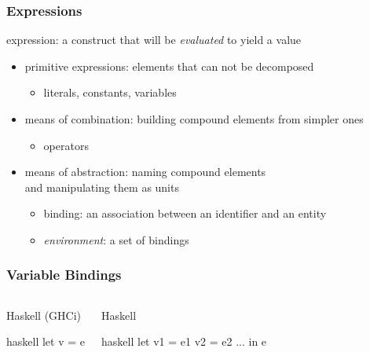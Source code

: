 \documentclass[dvipsnames]{beamer}
\theoremstyle{plain}
\begin{document}
\begin{frame}
  \frametitle{Expressions}

  \begin{definition}
    \alert{expression}: a construct that will be \emph{evaluated} to yield a value
  \end{definition}

  \pause
  \medskip
  \begin{itemize}
    \item primitive expressions: elements that can not be decomposed\\
    \begin{itemize}
      \item literals, constants, variables
    \end{itemize}
    \item means of combination: building compound elements from simpler ones\\
    \begin{itemize}
      \item operators
    \end{itemize}
    \item means of abstraction: naming compound elements\\
      and manipulating them as units
    \begin{itemize}
      \item \alert{binding}: an association between an identifier and an entity
      \item \emph{environment}: a set of bindings
    \end{itemize}
  \end{itemize}
\end{frame}

\begin{frame}[fragile]
  \frametitle{Variable Bindings}

  \begin{columns}[t]
    \begin{block}{Haskell (GHCi)}
      \begin{pygments}{haskell}
let v = e
      \end{pygments}
    \end{block}

    \pause
    \begin{block}{Haskell}
      \begin{pygments}{haskell}
let
    v1 = e1
    v2 = e2
    ...
in
    e
      \end{pygments}
    \end{block}
  \end{columns}
\end{frame}
\end{document}
